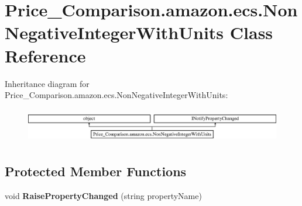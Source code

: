 \hypertarget{class_price___comparison_1_1amazon_1_1ecs_1_1_non_negative_integer_with_units}{\section{Price\-\_\-\-Comparison.\-amazon.\-ecs.\-Non\-Negative\-Integer\-With\-Units Class Reference}
\label{class_price___comparison_1_1amazon_1_1ecs_1_1_non_negative_integer_with_units}
}


 


Inheritance diagram for Price\-\_\-\-Comparison.\-amazon.\-ecs.\-Non\-Negative\-Integer\-With\-Units\-:\begin{figure}[H]
\begin{center}
\leavevmode
\includegraphics[height=1.546961cm]{class_price___comparison_1_1amazon_1_1ecs_1_1_non_negative_integer_with_units}
\end{center}
\end{figure}
\subsection*{Protected Member Functions}
\begin{DoxyCompactItemize}
\item 
\hypertarget{class_price___comparison_1_1amazon_1_1ecs_1_1_non_negative_integer_with_units_a19867b64f598375478a969c20ae4d634}{void {\bfseries Raise\-Property\-Changed} (string property\-Name)}\label{class_price___comparison_1_1amazon_1_1ecs_1_1_non_negative_integer_with_units_a19867b64f598375478a969c20ae4d634}

\end{DoxyCompactItemize}
